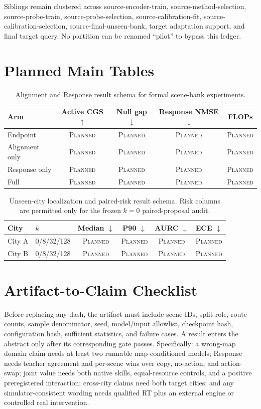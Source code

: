 \documentclass{article}
\newcommand{\planned}{\textsc{Planned}}
\begin{document}
Siblings remain clustered across source-encoder-train, source-method-selection,
source-probe-train, source-probe-selection, source-calibration-fit,
source-calibration-selection, source-final-unseen-bank, target adaptation
support, and final target query.  No partition can be
renamed ``pilot'' to bypass this ledger.

\section{Planned Main Tables}

\begin{table}[h]
\caption{Alignment and Response result schema for formal scene-bank experiments.}
\label{tab:planned-arms}
\centering
\small
\begin{tabular}{lcccc}
\toprule
Arm & Active CGS $\uparrow$ & Null gap $\downarrow$ & Response NMSE $\downarrow$ & FLOPs \\
\midrule
Endpoint & \planned & \planned & \planned & \planned \\
Alignment only & \planned & \planned & \planned & \planned \\
Response only & \planned & \planned & \planned & \planned \\
Full & \planned & \planned & \planned & \planned \\
\bottomrule
\end{tabular}
\end{table}

\begin{table}[h]
\caption{Unseen-city localization and paired-risk result schema. Risk columns
are permitted only for the frozen $k=0$ paired-proposal audit.}
\label{tab:planned-target}
\centering
\small
\begin{tabular}{llcccc}
\toprule
City & $k$ & Median $\downarrow$ & P90 $\downarrow$ & AURC $\downarrow$ & ECE $\downarrow$ \\
\midrule
City A & 0/8/32/128 & \planned & \planned & \planned & \planned \\
City B & 0/8/32/128 & \planned & \planned & \planned & \planned \\
\bottomrule
\end{tabular}
\end{table}

\section{Artifact-to-Claim Checklist}

Before replacing any dash, the artifact must include scene IDs, split role,
route counts, sample denominator, seed, model/input allowlist, checkpoint hash,
configuration hash, sufficient statistics, and failure cases.  A result enters
the abstract only after its corresponding gate passes.  Specifically: a
wrong-map domain claim needs at least two runnable map-conditioned models;
Response needs teacher agreement and per-scene wins over copy, no-action, and
action-swap; joint value needs both native skills, equal-resource controls, and
a positive preregistered interaction; cross-city claims need both target cities;
and any simulator-consistent wording needs qualified RT plus an external engine
or controlled real intervention.
\end{document}
